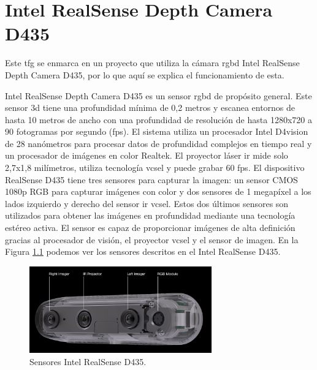 \chapter{Intel RealSense Depth Camera D435}
\label{cap:realsense-d435}

Este \gls{tfg} se enmarca en un proyecto que utiliza la cámara \gls{rgbd} Intel RealSense Depth Camera D435, por lo que aquí se explica el funcionamiento de esta.

Intel RealSense Depth Camera D435 es un sensor \gls{rgbd} de propósito general. 
Este sensor \gls{3d} tiene una profundidad mínima de 0,2 metros y escanea entornos de hasta 10 metros de ancho con una profundidad de resolución de hasta 1280x720 a 90 fotogramas por segundo (fps).
El sistema utiliza un procesador Intel D4vision de 28 nanómetros para procesar datos de profundidad complejos en tiempo real y un procesador de imágenes en color Realtek.
El proyector láser \gls{ir} mide solo 2,7x1,8 milímetros, utiliza tecnología \gls{vcsel} y puede grabar 60 fps.
El dispositivo RealSense D435 tiene tres sensores para capturar la imagen: un sensor CMOS 1080p RGB para capturar imágenes con color y dos sensores de 1 megapíxel a los lados izquierdo y derecho del sensor \gls{ir} \gls{vcsel}.
Estos dos últimos sensores son utilizados para obtener las imágenes en profundidad mediante una tecnología estéreo activa.
El sensor es capaz de proporcionar imágenes de alta definición gracias al procesador de visión, el proyector \gls{vcsel} y el sensor de imagen.
En la Figura \ref{fig:d435-sensors2} podemos ver los sensores descritos en el Intel RealSense D435.

\begin{figure}[h]
    \centering
    \includegraphics[width=0.7\textwidth]{archivos/d435_sensors.jpg}
    \caption{Sensores Intel RealSense D435.}
    \label{fig:d435-sensors2}
\end{figure}

